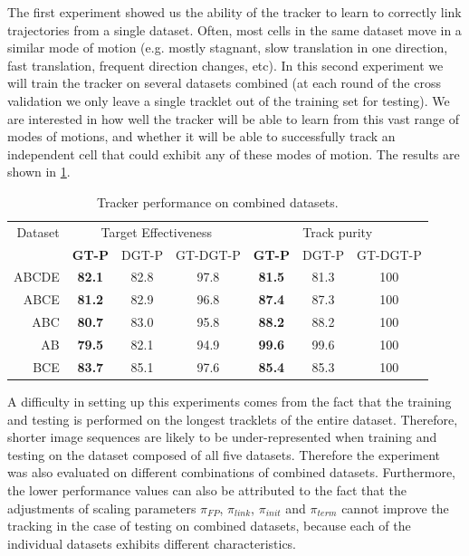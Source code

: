 		The first experiment showed us the ability of the tracker to learn to correctly link trajectories from a single dataset. Often, most cells in the same dataset move in a similar mode of motion (e.g. mostly stagnant, slow translation in one direction, fast translation, frequent direction changes, etc). In this second experiment we will train the tracker on several datasets combined (at each round of the cross validation we only leave a single tracklet out of the training set for testing). We are interested in how well the tracker will be able to learn from this vast range of modes of motions, and whether it will be able to successfully track an independent cell that could exhibit any of these modes of motion. The results are shown in \cref{tab:results_tracker_combined}.
		
		\begin{table}[h]
			\centering
			\begin{tabular}{r*{3}{c}*{3}{c}}
				Dataset & \multicolumn{3}{c}{Target Effectiveness} & \multicolumn{3}{c}{Track purity} \\
				        & \textbf{GT-P} & DGT-P &     GT-DGT-P     & \textbf{GT-P} & DGT-P & GT-DGT-P \\
			\hline
				  ABCDE & \textbf{82.1} & 82.8  &       97.8       & \textbf{81.5} & 81.3  &   100    \\
				   ABCE & \textbf{81.2} & 82.9  &       96.8       & \textbf{87.4} & 87.3  &   100    \\
				    ABC & \textbf{80.7} & 83.0  &       95.8       & \textbf{88.2} & 88.2  &   100    \\
				     AB & \textbf{79.5} & 82.1  &       94.9       & \textbf{99.6} & 99.6  &   100    \\
				    BCE & \textbf{83.7} & 85.1  &       97.6       & \textbf{85.4} & 85.3  &   100
			\end{tabular} 
			\caption{Tracker performance on combined datasets.}
			\label{tab:results_tracker_combined}
		\end{table}

		A difficulty in setting up this experiments comes from the fact that the training and testing is performed on the longest tracklets of the entire dataset. Therefore, shorter image sequences are likely to be under-represented when training and testing on the dataset composed of all five datasets. Therefore the experiment was also evaluated on different combinations of combined datasets. Furthermore, the lower performance values can also be attributed to the fact that the adjustments of scaling parameters $\pi_{FP}$, $\pi_{link}$, $\pi_{init}$ and $\pi_{term}$ cannot improve the tracking in the case of testing on combined datasets, because each of the individual datasets exhibits different characteristics.

